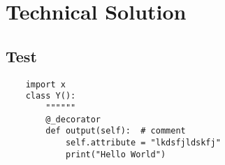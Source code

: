 \documentclass[./project-report/src/latex/project-report.tex]{subfiles}
\begin{document}
\maketitle

\section{Technical Solution}

\subsection{Test}  %

\begin{verbatim}
    import x
    class Y():
        """"""
        @_decorator
        def output(self):  # comment
            self.attribute = "lkdsfjldskfj"
            print("Hello World")
\end{verbatim}

\inputminted{python}{./school_project/__main__.py}
\end{document}
